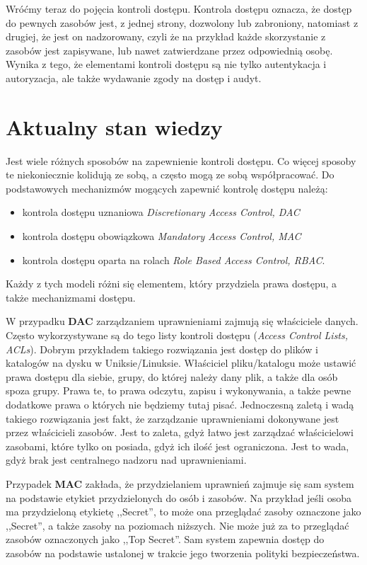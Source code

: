\documentclass{classrep}
\begin{document}
Wróćmy teraz do pojęcia kontroli dostępu. Kontrola dostępu oznacza, że dostęp do pewnych zasobów jest, z jednej strony, dozwolony lub zabroniony, natomiast z drugiej, że
jest on nadzorowany, czyli że na przykład każde skorzystanie z zasobów jest zapisywane, lub nawet zatwierdzane przez odpowiednią osobę. Wynika z tego, że elementami kontroli
dostępu są nie tylko autentykacja i autoryzacja, ale także wydawanie zgody na dostęp i audyt.
\section{Aktualny stan wiedzy}
Jest wiele różnych sposobów na zapewnienie kontroli dostępu. Co więcej sposoby te niekoniecznie kolidują ze sobą, a często mogą ze sobą współpracować. Do podstawowych mechanizmów
mogących zapewnić kontrolę dostępu należą\cite{owasp}\cite{computer}\cite{wikibooks}:
\begin{itemize}
\item kontrola dostępu uznaniowa \textit{Discretionary Access Control, DAC}
\item kontrola dostępu obowiązkowa \textit{Mandatory Access Control, MAC}
\item kontrola dostępu oparta na rolach \textit{Role Based Access Control, RBAC}.
\end{itemize}
Każdy z tych modeli różni się elementem, który przydziela prawa dostępu, a także mechanizmami dostępu\cite{wikibooks}. 

W przypadku \textbf{DAC} zarządzaniem uprawnieniami zajmują się właściciele danych. Często wykorzystywane są do tego listy kontroli dostępu (\textit{Access Control Lists, ACLs}).
Dobrym przykładem takiego rozwiązania jest dostęp do plików i katalogów na dysku w Uniksie/Linuksie. Właściciel pliku/katalogu może ustawić prawa dostępu dla siebie, grupy, do której należy
dany plik, a także dla osób spoza grupy. Prawa te, to prawa odczytu, zapisu i wykonywania, a także pewne dodatkowe prawa o których nie będziemy tutaj pisać. Jednoczesną zaletą i wadą takiego
rozwiązania jest fakt, że zarządzanie uprawnieniami dokonywane jest przez właścicieli zasobów. Jest to zaleta, gdyż łatwo jest zarządzać właścicielowi zasobami, które tylko on posiada,
gdyż ich ilość jest ograniczona. Jest to wada, gdyż brak jest centralnego nadzoru nad uprawnieniami.

Przypadek \textbf{MAC} zakłada, że przydzielaniem uprawnień zajmuje się sam system na podstawie etykiet przydzielonych do osób i zasobów. Na przykład jeśli osoba ma przydzieloną
etykietę ,,Secret'', to może ona przeglądać zasoby oznaczone jako ,,Secret'', a także zasoby na poziomach niższych. Nie może już za to przeglądać zasobów oznaczonych jako ,,Top Secret''.
Sam system zapewnia dostęp do zasobów na podstawie ustalonej w trakcie jego tworzenia polityki bezpieczeństwa.
\end{document}
